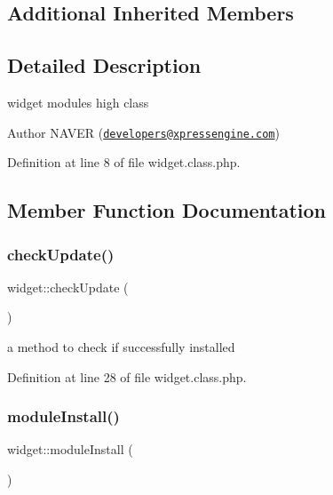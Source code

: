 \subsection*{Additional Inherited Members}


\subsection{Detailed Description}
widget module\textquotesingle{}s high class 

\begin{DoxyAuthor}{Author}
N\+A\+V\+ER (\href{mailto:developers@xpressengine.com}{\tt developers@xpressengine.\+com}) 
\end{DoxyAuthor}


Definition at line 8 of file widget.\+class.\+php.



\subsection{Member Function Documentation}
\hypertarget{classwidget_a40ce2841fc3aa0dade2ce5609c08ea9e}{}\label{classwidget_a40ce2841fc3aa0dade2ce5609c08ea9e} 
\subsubsection{\texorpdfstring{check\+Update()}{checkUpdate()}}
{\footnotesize\ttfamily widget\+::check\+Update (\begin{DoxyParamCaption}{ }\end{DoxyParamCaption})}



a method to check if successfully installed 



Definition at line 28 of file widget.\+class.\+php.

\hypertarget{classwidget_ae5a0f29ef320000b10196c8ce3d1bcdc}{}\label{classwidget_ae5a0f29ef320000b10196c8ce3d1bcdc} 
\subsubsection{\texorpdfstring{module\+Install()}{moduleInstall()}}
{\footnotesize\ttfamily widget\+::module\+Install (\begin{DoxyParamCaption}{ }\end{DoxyParamCaption})}



